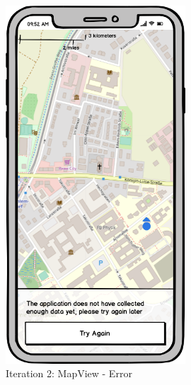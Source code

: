 \begin{figure}[H]
\begin{minipage}[b]{0.45\textwidth}
    \includegraphics[width=0.6\textwidth]{images/UI/Iteration2-MapView-Error.png}
    \caption{Iteration 2: MapView - Error}
    \label{fig:i2-mv-error}
  \end{minipage}
\end{figure}

